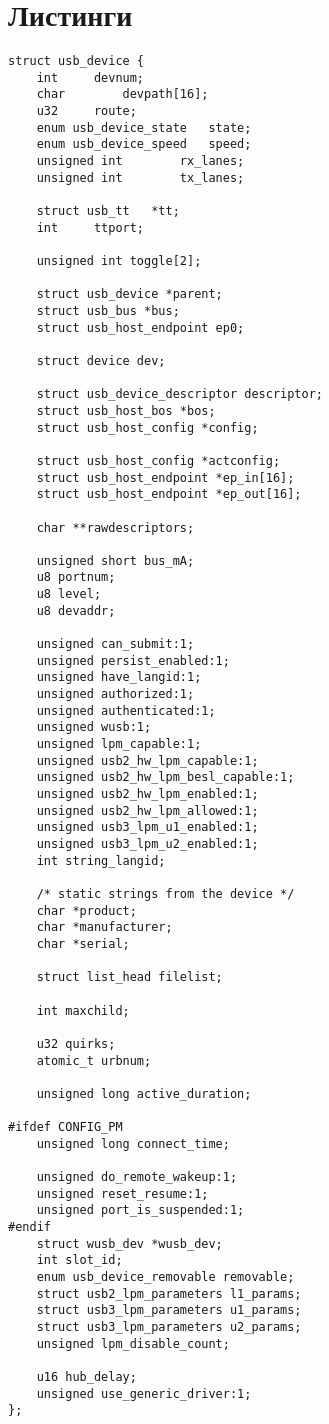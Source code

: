 \chapter{Листинги}

 \begin{lstlisting}[caption = Структура usb\_device, label =  lst:usb_device]
struct usb_device {
	int		devnum;
	char		devpath[16];
	u32		route;
	enum usb_device_state	state;
	enum usb_device_speed	speed;
	unsigned int		rx_lanes;
	unsigned int		tx_lanes;

	struct usb_tt	*tt;
	int		ttport;

	unsigned int toggle[2];

	struct usb_device *parent;
	struct usb_bus *bus;
	struct usb_host_endpoint ep0;

	struct device dev;

	struct usb_device_descriptor descriptor;
	struct usb_host_bos *bos;
	struct usb_host_config *config;

	struct usb_host_config *actconfig;
	struct usb_host_endpoint *ep_in[16];
	struct usb_host_endpoint *ep_out[16];

	char **rawdescriptors;

	unsigned short bus_mA;
	u8 portnum;
	u8 level;
	u8 devaddr;

	unsigned can_submit:1;
	unsigned persist_enabled:1;
	unsigned have_langid:1;
	unsigned authorized:1;
	unsigned authenticated:1;
	unsigned wusb:1;
	unsigned lpm_capable:1;
	unsigned usb2_hw_lpm_capable:1;
	unsigned usb2_hw_lpm_besl_capable:1;
	unsigned usb2_hw_lpm_enabled:1;
	unsigned usb2_hw_lpm_allowed:1;
	unsigned usb3_lpm_u1_enabled:1;
	unsigned usb3_lpm_u2_enabled:1;
	int string_langid;

	/* static strings from the device */
	char *product;
	char *manufacturer;
	char *serial;

	struct list_head filelist;

	int maxchild;

	u32 quirks;
	atomic_t urbnum;

	unsigned long active_duration;

#ifdef CONFIG_PM
	unsigned long connect_time;

	unsigned do_remote_wakeup:1;
	unsigned reset_resume:1;
	unsigned port_is_suspended:1;
#endif
	struct wusb_dev *wusb_dev;
	int slot_id;
	enum usb_device_removable removable;
	struct usb2_lpm_parameters l1_params;
	struct usb3_lpm_parameters u1_params;
	struct usb3_lpm_parameters u2_params;
	unsigned lpm_disable_count;

	u16 hub_delay;
	unsigned use_generic_driver:1;
};
 \end{lstlisting}
 
